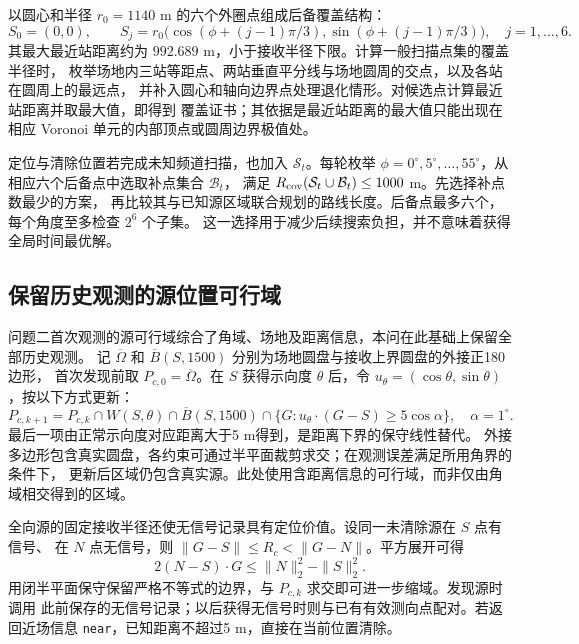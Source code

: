 以圆心和半径 $r_0=1140$ m 的六个外圈点组成后备覆盖结构：
\begin{equation}\label{eq:p3-stations}
S_0=(0,0),\qquad
S_j=r_0\bigl(\cos(\phi+(j-1)\pi/3),\sin(\phi+(j-1)\pi/3)\bigr),\quad j=1,\ldots,6.
\end{equation}
其最大最近站距离约为 $992.689$ m，小于接收半径下限。计算一般扫描点集的覆盖半径时，
枚举场地内三站等距点、两站垂直平分线与场地圆周的交点，以及各站在圆周上的最远点，
并补入圆心和轴向边界点处理退化情形。对候选点计算最近站距离并取最大值，即得到
覆盖证书；其依据是最近站距离的最大值只能出现在相应 Voronoi 单元的内部顶点或圆周边界极值处。

定位与清除位置若完成未知频道扫描，也加入 $\mathcal S_t$。每轮枚举
$\phi=0^\circ,5^\circ,\ldots,55^\circ$，从相应六个后备点中选取补点集合 $\mathcal B_t$，
满足 $R_{\rm cov}(\mathcal S_t\cup\mathcal B_t)\le1000$ m。先选择补点数最少的方案，
再比较其与已知源区域联合规划的路线长度。后备点最多六个，每个角度至多检查 $2^6$ 个子集。
这一选择用于减少后续搜索负担，并不意味着获得全局时间最优解。

\subsection{保留历史观测的源位置可行域}

问题二首次观测的源可行域综合了角域、场地及距离信息，本问在此基础上保留全部历史观测。
记 $\overline\Omega$ 和 $\overline B(S,1500)$ 分别为场地圆盘与接收上界圆盘的外接正180边形，
首次发现前取 $P_{c,0}=\overline\Omega$。在 $S$ 获得示向度 $\theta$ 后，令
$u_\theta=(\cos\theta,\sin\theta)$，按以下方式更新：
\begin{equation}\label{eq:p3-update}
P_{c,k+1}=P_{c,k}\cap W(S,\theta)\cap\overline B(S,1500)
\cap\{G:u_\theta\cdot(G-S)\ge5\cos\alpha\},\quad \alpha=1^\circ.
\end{equation}
最后一项由正常示向度对应距离大于5 m得到，是距离下界的保守线性替代。
外接多边形包含真实圆盘，各约束可通过半平面裁剪求交；在观测误差满足所用角界的条件下，
更新后区域仍包含真实源。此处使用含距离信息的可行域，而非仅由角域相交得到的区域。

全向源的固定接收半径还使无信号记录具有定位价值。设同一未清除源在 $S$ 点有信号、
在 $N$ 点无信号，则 $\|G-S\|\le R_c<\|G-N\|$。平方展开可得
\begin{equation}\label{eq:p3-nosignal}
2(N-S)\cdot G\le\|N\|_2^2-\|S\|_2^2.
\end{equation}
用闭半平面保守保留严格不等式的边界，与 $P_{c,k}$ 求交即可进一步缩域。发现源时调用
此前保存的无信号记录；以后获得无信号时则与已有有效测向点配对。若返回近场信息
\texttt{near}，已知距离不超过5 m，直接在当前位置清除。

